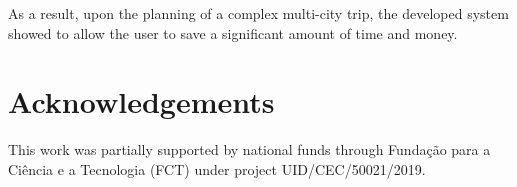 \documentclass[onecolumn]{elsarticle}
\begin{document}
As a result, upon the planning of a complex multi-city trip, the developed system showed to allow the user to save a significant amount of time and money.
\section*{Acknowledgements}
This work was partially supported by national funds through Funda\c{c}\~ao para a Ci\^encia e a Tecnologia (FCT) under project UID/CEC/50021/2019.



%








\end{document}
